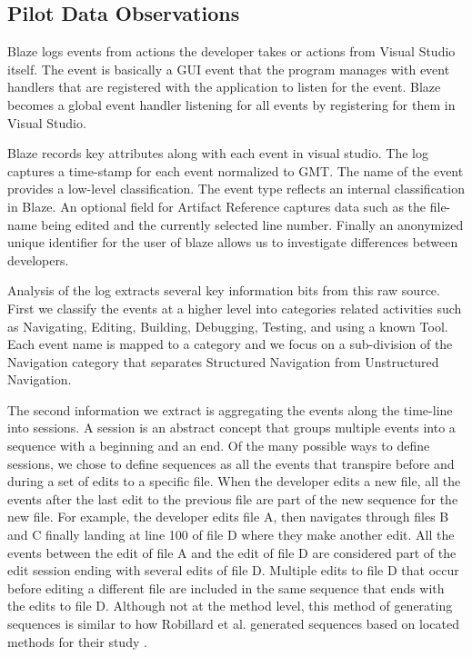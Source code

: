\documentclass{sig-alternate}
\begin{document}
\subsection{Pilot Data Observations}

Blaze logs events from actions the developer takes or actions from Visual Studio itself.
 The event is basically a GUI event that the program manages with event handlers that are registered with the application to listen for the event.  Blaze becomes a global event handler listening for all events by registering for them in Visual Studio.  

Blaze records key attributes along with each event in visual studio.  The log captures a time-stamp for each event normalized to GMT.  The name of the event provides a low-level classification.  The event type reflects an internal classification in Blaze.  An optional field for Artifact Reference captures data such as the file-name being edited and the currently selected line number.  Finally an anonymized unique identifier for the user of blaze allows us to investigate differences between developers.

Analysis of the log extracts several key information bits from this raw source.  First we classify the events at a higher level into categories related activities such as Navigating, Editing, Building, Debugging,  Testing, and using a  known Tool.  Each event name is mapped to a category and we focus on a sub-division of the Navigation category that separates Structured Navigation from Unstructured Navigation.

The second information we extract is aggregating the events along the time-line into sessions.  A session is an abstract concept that groups multiple events into a sequence with a beginning and an end.  Of the many possible ways to define sessions, we chose to define sequences as all the events that transpire before and during a set of edits to a specific file.  When the developer edits a new file, all the events after the last edit to the previous file are part of the new sequence for the new file.  For example, the developer edits file A, then navigates through files B and C finally landing at line 100 of file D where they make another edit.  All the events between the edit of file A and the edit of file D are considered part of the edit session ending with several edits of file D.  Multiple edits to file D that occur before editing a different file are included in the same sequence that ends with the edits to file D.  Although not at the method level, this method of generating sequences is similar to how Robillard et al. generated sequences based on located methods for their study \cite{wbsnipes:Robillard2004How}.
\end{document}
